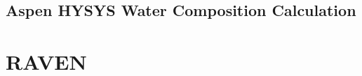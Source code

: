 \documentclass[12pt]{UIdahoMastersThesis}
\begin{document}
\newpage

\section{Aspen HYSYS Water Composition Calculation}



\chapter{RAVEN}



% 

% 

\clearpage


% 

% 

\end{document}
